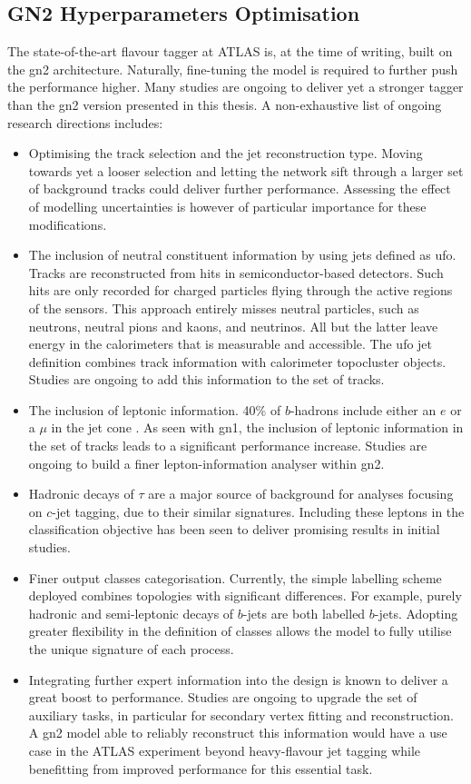 \subsection{GN2 Hyperparameters Optimisation}\label{chap-GN2Opt}
The state-of-the-art flavour tagger at ATLAS is, at the time of writing, built on the \gls{gn2} architecture. Naturally, fine-tuning the model is required to further push the performance higher. Many studies are ongoing to deliver yet a stronger tagger than the \gls{gn2} version presented in this thesis. A non-exhaustive list of ongoing research directions includes: 
\begin{itemize}
  \item Optimising the track selection and the jet reconstruction type. Moving towards yet a looser selection and letting the network sift through a larger set of background tracks could deliver further performance. Assessing the effect of modelling uncertainties is however of particular importance for these modifications.
  \item The inclusion of neutral constituent information by using jets defined as \gls{ufo}. Tracks are reconstructed from hits in semiconductor-based detectors. Such hits are only recorded for charged particles flying through the active regions of the sensors. This approach entirely misses neutral particles, such as neutrons, neutral pions and kaons, and neutrinos. All but the latter leave energy in the calorimeters that is measurable and accessible. The \gls{ufo} jet definition combines track information with calorimeter topocluster objects. Studies are ongoing to add this information to the set of tracks. 
  \item The inclusion of leptonic information. 40\% of $b$-hadrons include either an $e$ or a $\mu$ in the jet cone \cite{Tanabashi:2018oca}. As seen with \gls{gn1}, the inclusion of leptonic information in the set of tracks leads to a significant performance increase. Studies are ongoing to build a finer lepton-information analyser within \gls{gn2}.
  \item Hadronic decays of $\tau$ are a major source of background for analyses focusing on $c$-jet tagging, due to their similar signatures. Including these leptons in the classification objective has been seen to deliver promising results in initial studies. 
  \item Finer output classes categorisation. Currently, the simple labelling scheme deployed combines topologies with significant differences. For example, purely hadronic and semi-leptonic decays of $b$-jets are both labelled $b$-jets. Adopting greater flexibility in the definition of classes allows the model to fully utilise the unique signature of each process. 
  \item Integrating further expert information into the design is known to deliver a great boost to performance. Studies are ongoing to upgrade the set of auxiliary tasks, in particular for secondary vertex fitting and reconstruction. A \gls{gn2} model able to reliably reconstruct this information would have a use case in the ATLAS experiment beyond heavy-flavour jet tagging while benefitting from improved performance for this essential task.  
\end{itemize}

